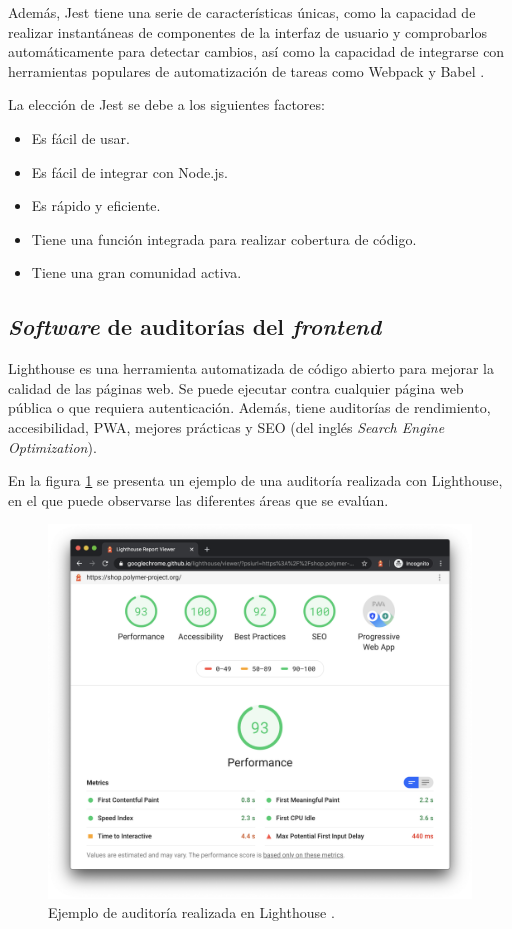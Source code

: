 Además, Jest tiene una serie de características únicas, como la capacidad de realizar instantáneas \citep{WEBSITE:COPIAINSTANTANEA} de componentes de la interfaz de usuario y comprobarlos automáticamente para detectar cambios, así como la capacidad de integrarse con herramientas populares de automatización de tareas como Webpack \citep{WEBSITE:WEBPACK} y Babel \citep{WEBSITE:BABEL}. 

La elección de Jest se debe a los siguientes factores: 
\begin{itemize}
	\item Es fácil de usar.
	\item Es fácil de integrar con Node.js.
	\item Es rápido y eficiente.
	\item Tiene una función integrada para realizar cobertura de código.
	\item Tiene una gran comunidad activa.
\end{itemize}

\subsection{\emph{Software} de auditorías del \emph{frontend}}

Lighthouse \citep{WEBSITE:LIGHTHOUSE} es una herramienta automatizada de código abierto para mejorar la calidad de las páginas web. Se puede ejecutar contra cualquier página web pública o que requiera autenticación. Además, tiene auditorías de rendimiento, accesibilidad, PWA, mejores prácticas y SEO (del inglés \textit{Search Engine Optimization}).

En la figura \ref{fig:ejemploDeAuditoriaLighthouse} se presenta un ejemplo de una auditoría realizada con Lighthouse, en el que puede observarse las diferentes áreas que se evalúan.

\begin{figure}[H]
	\centering
	\includegraphics[width=.8\textwidth]{./Figures/Ejemplo de auditoria Lighthouse.png}
	\caption{Ejemplo de auditoría realizada en Lighthouse \protect\footnotemark.}
	\label{fig:ejemploDeAuditoriaLighthouse}
\end{figure}

